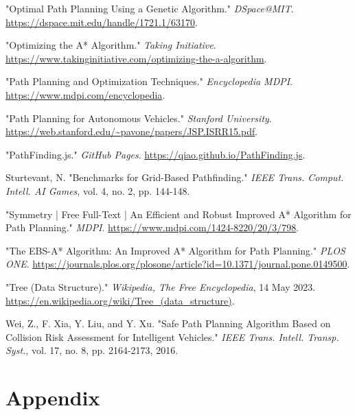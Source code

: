 \documentclass[12pt]{article}
\begin{document}
\begin{enumerate}[label={[\arabic*]}]
    \item "Optimal Path Planning Using a Genetic Algorithm." \textit{DSpace@MIT}. \url{https://dspace.mit.edu/handle/1721.1/63170}.
    \item "Optimizing the A* Algorithm." \textit{Taking Initiative}. \url{https://www.takinginitiative.com/optimizing-the-a-algorithm}.
    \item "Path Planning and Optimization Techniques." \textit{Encyclopedia MDPI}. \url{https://www.mdpi.com/encyclopedia}.
    \item "Path Planning for Autonomous Vehicles." \textit{Stanford University}. \url{https://web.stanford.edu/~pavone/papers/JSP.ISRR15.pdf}.
    \item "PathFinding.js." \textit{GitHub Pages}. \url{https://qiao.github.io/PathFinding.js}.
    \item Sturtevant, N. "Benchmarks for Grid-Based Pathfinding." \textit{IEEE Trans. Comput. Intell. AI Games}, vol. 4, no. 2, pp. 144-148.
    \item "Symmetry | Free Full-Text | An Efficient and Robust Improved A* Algorithm for Path Planning." \textit{MDPI}. \url{https://www.mdpi.com/1424-8220/20/3/798}.
    \item "The EBS-A* Algorithm: An Improved A* Algorithm for Path Planning." \textit{PLOS ONE}. \url{https://journals.plos.org/plosone/article?id=10.1371/journal.pone.0149500}.
    \item "Tree (Data Structure)." \textit{Wikipedia, The Free Encyclopedia}, 14 May 2023. \url{https://en.wikipedia.org/wiki/Tree_(data_structure)}.
    \item Wei, Z., F. Xia, Y. Liu, and Y. Xu. "Safe Path Planning Algorithm Based on Collision Risk Assessment for Intelligent Vehicles." \textit{IEEE Trans. Intell. Transp. Syst.}, vol. 17, no. 8, pp. 2164-2173, 2016.
\end{enumerate}
\newpage
\section{Appendix}
\end{document}
